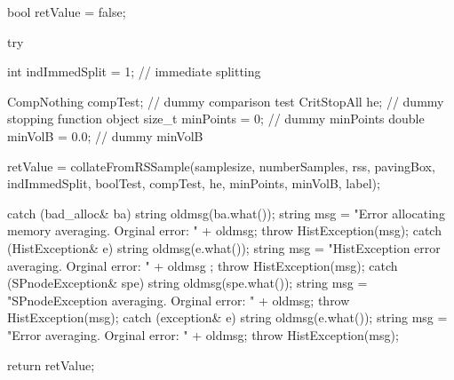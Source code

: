 \begin{DoxyCode}
{
    bool retValue = false;

    try {

        int indImmedSplit = 1; // immediate splitting

        CompNothing compTest; // dummy comparison test
        CritStopAll he; // dummy stopping function object
        size_t minPoints = 0; // dummy minPoints
        double minVolB = 0.0; // dummy minVolB

        retValue = collateFromRSSample(samplesize, numberSamples, rss,
                                    pavingBox, indImmedSplit, boolTest,
                                    compTest, he, minPoints, minVolB, label);
    }
    catch (bad_alloc& ba) {
        string oldmsg(ba.what());
        string msg = "Error allocating memory averaging.  Orginal error: "
                                            + oldmsg;
        throw HistException(msg);
    }
    catch (HistException& e) {
        string oldmsg(e.what());
        string msg = "HistException error averaging.  Orginal error: " + oldmsg
      ;
        throw HistException(msg);
    }
    catch (SPnodeException& spe) {
        string oldmsg(spe.what());
        string msg = "SPnodeException averaging.  Orginal error: " + oldmsg;
        throw HistException(msg);
    }
    catch (exception& e) {
        string oldmsg(e.what());
        string msg = "Error averaging.  Orginal error: " + oldmsg;
        throw HistException(msg);
    }

    return retValue;
}
\end{DoxyCode}
